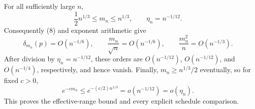 For all sufficiently large \(n\),
\[
\frac12n^{1/3}\leq m_n\leq n^{1/3},
\qquad
\eta_n=n^{-1/12}.
\]
Consequently (8) and exponent arithmetic give
\[
\delta_{m_n}(p)=O(n^{-1/6}),
\qquad
\frac{m_n}{\sqrt n}=O(n^{-1/6}),
\qquad
\frac{m_n^2}{n}=O(n^{-1/3}).
\tag{9}
\]
After division by \(\eta_n=n^{-1/12}\), these orders are \(O(n^{-1/12})\), \(O(n^{-1/12})\), and \(O(n^{-1/4})\), respectively, and hence vanish.  Finally, \(m_n\geq n^{1/3}/2\) eventually, so for fixed \(c>0\),
\[
e^{-cm_n}\leq e^{-(c/2)n^{1/3}}=o(n^{-1/12})=o(\eta_n).
\]
This proves the effective-range bound and every explicit schedule comparison.